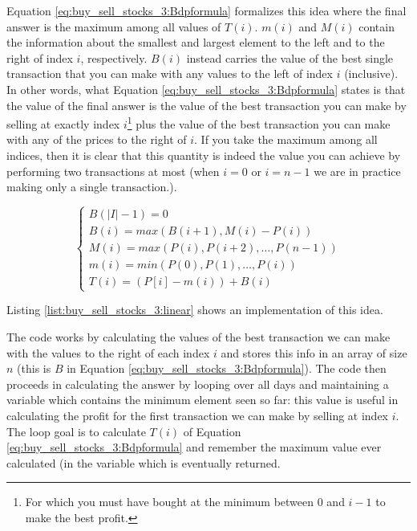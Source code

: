 Equation \ref{eq:buy_sell_stocks_3:Bdpformula} formalizes this idea where the final answer is the maximum among all values of $T(i)$.
$m(i)$ and $M(i)$ contain the information about the smallest and largest element to the left and to the right of index $i$, respectively.
$B(i)$ instead carries the value of the best single transaction that you can make with any values to the left of index $i$ (inclusive).
In other words, what Equation \ref{eq:buy_sell_stocks_3:Bdpformula} states is that the value of the final answer is the value of the best transaction you can make by selling at exactly index $i$\footnote{For which you must have bought at the minimum between $0$ and $i-1$ to make the best profit.} 
plus the value of the best transaction you can make with any of the prices to the right of $i$.
If you take the maximum among all indices, then it is clear that this quantity is indeed the value you can achieve by performing two transactions at most (when $i=0$ or $i=n-1$ we are in practice making only a single transaction.).

\begin{equation}
    \begin{cases}
        B(|I|-1) = 0 \\
        B(i) = max(B(i+1), M(i)-P(i)) \\
        M(i) = max(P(i), P(i+2), \ldots, P(n-1)) \\
        m(i) = min(P(0), P(1), \ldots, P(i)) \\
        T(i) = (P[i]-m(i)) + B(i)
     \end{cases}
    \label{eq:buy_sell_stocks_3:Bdpformula}
\end{equation}

Listing \ref{list:buy_sell_stocks_3:linear} shows an implementation of this idea.



The code works by calculating the values of the best transaction we can make with the values to the right of each index $i$ and stores this info in an array of size $n$ (this is $B$ in Equation \ref{eq:buy_sell_stocks_3:Bdpformula}).
The code then proceeds in calculating the answer by looping over all days and maintaining a variable  which contains the minimum element seen so far: this value is useful in calculating the profit for the first transaction we can make by selling at index $i$.
The loop goal is to calculate $T(i)$ of Equation \ref{eq:buy_sell_stocks_3:Bdpformula} and remember the maximum value ever calculated (in the variable which is eventually returned.

